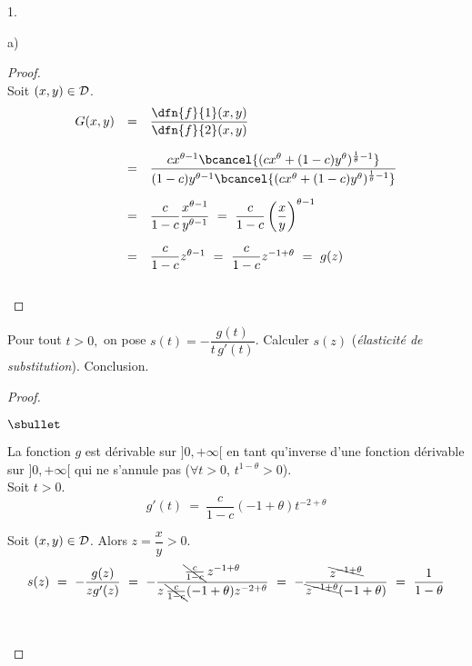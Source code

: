 \begin{noliste}{1.}
\begin{noliste}{a)}
  \begin{proof}~\\
   Soit $(x,y) \in {\cal D}$.
   \[
    \begin{array}{rcl}
     G(x,y) &=& \dfrac{\dfn{f}{1}(x,y)}{\dfn{f}{2}(x,y)}
     \\[.6cm]
     &=& \dfrac{c x^{\theta-1} \bcancel{(c x^\theta + (1-c) y^\theta)^{
     \frac{1}{\theta}-1}}}{(1-c) y^{\theta-1}\bcancel{(c x^\theta + 
     (1-c) y^\theta)^{\frac{1}{\theta}-1}}}
     \\[.6cm]
     &=& \dfrac{c}{1-c} \dfrac{x^{\theta-1}}{y^{\theta-1}}
     \ = \ \dfrac{c}{1-c} \left(\dfrac{x}{y}\right)^{\theta-1}
     \\[.6cm]
     &=& \dfrac{c}{1-c} z^{\theta-1}
     \ = \ \dfrac{c}{1-c} z^{-1+\theta}
     \ = \ g(z)
    \end{array}
   \]
   ~\\[-1cm]
  \end{proof}

  
  \item\label{3b} Pour tout $t>0,$ on pose $s(t)=-\dfrac{g(t)}{t 
  \, g'(t)}$.
  Calculer $s(z)$ ({\it élasticité de substitution}). Conclusion.
  
  \begin{proof}~
   \begin{noliste}{$\sbullet$}
    \item La fonction $g$ est dérivable sur $]0,+\infty[$ en tant
    qu'inverse d'une fonction dérivable sur $]0,+\infty[$ qui ne 
    s'annule pas
    ($\forall t>0$, $t^{1-\theta} >0$).\\
    Soit $t>0$.
    \[
     g'(t) \ = \ \dfrac{c}{1-c}(-1+\theta) t^{-2+\theta}
    \]
    
    \item Soit $(x,y)\in {\cal D}$. Alors $z=\dfrac{x}{y}>0$.
    \[
     s(z) \ = \ -\dfrac{g(z)}{zg'(z)} \ = \ 
     -\dfrac{\bcancel{\frac{c}{1-c}} \, z^{-1+\theta}}
     {z \, \bcancel{\frac{c}{1-c}} (-1+\theta) z^{-2+\theta}}
     \ = \ - \dfrac{\bcancel{z^{-1+\theta}}}
     {\bcancel{z^{-1+\theta}} (-1+\theta)}
     \ = \ \dfrac{1}{1-\theta}
    \]
    
    ~\\[-1.4cm]
   \end{noliste}
  \end{proof}
 \end{noliste}
 

\end{noliste}

